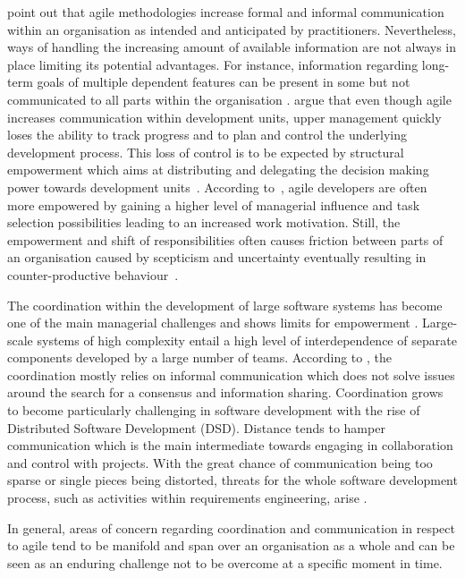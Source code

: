\citet{pikkarainen2008impactagilecommunication} point out that agile methodologies increase formal and informal communication within an organisation as intended and anticipated by practitioners. Nevertheless, ways of handling the increasing amount of available information are not always in place limiting its potential advantages. For instance, information regarding long-term goals of multiple dependent features can be present in some but not communicated to all parts within the organisation \citep{pikkarainen2008impactagilecommunication}. \citet{cohn2003introducingagiletoanorganisation} argue that even though agile increases communication within development units, upper management quickly loses the ability to track progress and to plan and control the underlying development process. This loss of control is to be expected by structural empowerment 
which aims at distributing and delegating the decision making power towards development units~\citep{millslimitsempowerment}. According to~\citet{tessemindividualempoqerment}, agile developers are often more empowered by gaining a higher level of managerial influence and task selection possibilities leading to an increased work motivation.
Still, the empowerment and shift of responsibilities often causes friction between parts of an organisation caused by scepticism and uncertainty eventually resulting in counter-productive behaviour~\citep{millslimitsempowerment}. 

The coordination within the development of large software systems has become one of the main managerial challenges and shows limits for empowerment \citep{kraut1995coordinationinsd}. Large-scale systems of high complexity entail a high level of interdependence of separate components developed by a large number of teams. According to \citet{kraut1995coordinationinsd}, the coordination mostly relies on informal communication which does not solve issues around the search for a consensus and information sharing. Coordination grows to become particularly challenging in software development with the rise of Distributed Software Development (DSD). Distance tends to hamper communication which is the main intermediate towards engaging in collaboration and control with projects. With the great chance of communication being too sparse or single pieces being distorted, threats for the whole software development process, such as activities within requirements engineering, arise \citep{prikladnicki2003globalsoftware}.       

In general, areas of concern regarding coordination and communication in respect to agile tend to be manifold and span over an organisation as a whole and can be seen as an enduring challenge not to be overcome at a specific moment in time.